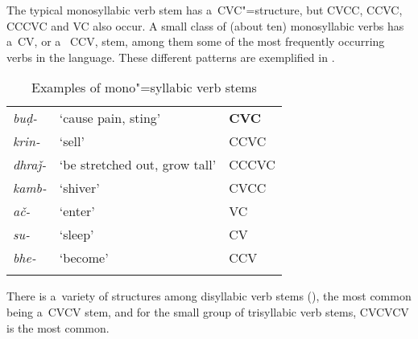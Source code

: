 The typical monosyllabic verb stem has a~CVC"=structure, but CVCC, CCVC, CCCVC and VC also occur. A small class of (about ten) monosyllabic verbs has a~CV, or a ~CCV, stem, among them some of the most frequently occurring verbs in the language. These different patterns are exemplified in . 

\begin{table}[t]
\caption{Examples of mono"=syllabic verb stems}
\begin{tabularx}{\textwidth}{ Q l Q }
\lsptoprule
\textit{buḍ-} &
`cause pain, sting' &
\textbf{CVC}\\
\textit{krin-} &
`sell' &
CCVC\\
\textit{dhraǰ-} &
`be stretched out, grow tall' &
CCCVC\\
\textit{kamb-} &
`shiver' &
CVCC\\
\textit{ač-} &
`enter' &
VC\\
\textit{su-} &
`sleep' &
CV\\
\textit{bhe-} &
`become' &
CCV\\\lspbottomrule
\end{tabularx}
\label{tab:8-mono}
\end{table}
 
There is a~variety of structures among disyllabic verb stems (), the most common being a~CVCV stem, and for the small group of trisyllabic verb stems, CVCVCV is the most common.

